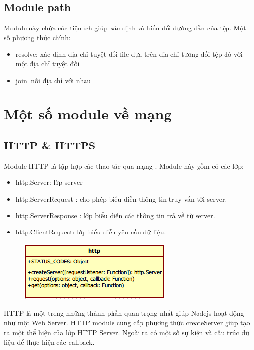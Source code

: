 	\subsection{Module  path}

		Module này chứa các tiện ích giúp xác định và biến đổi đường dẫn của tệp. Một số phương thức chính:
		\begin{itemize}
			\item resolve: xác định địa chỉ tuyệt đối file dựa trên địa chỉ tương đối tệp đó với một địa chỉ tuyệt đối
			\item join: nối địa chỉ với nhau
		\end{itemize}
		

\section{Một số module về mạng}
	\subsection{HTTP \& HTTPS}
	Module HTTP là tập hợp các thao tác qua mạng . Module này gồm có các lớp:
		\begin{itemize}
			\item http.Server: lớp server
			\item http.ServerRequest : cho phép biểu diễn thông tin truy vấn tới server.
			\item http.ServerResponse : lớp biểu diễn các thông tin trả về từ server.
			\item http.ClientRequest: lớp biểu diễn yêu cầu dữ liệu.
		\end{itemize}	
		
		\begin{figure}[h]
	    	\centering
			\includegraphics[scale=0.7]{3_3_1}
		\end{figure}		 
		
		HTTP là một trong những thành phần quan trọng nhất giúp Nodejs hoạt động như một Web Server. HTTP module cung cấp phương thức createServer giúp tạo ra một thể hiện của lớp HTTP Server. Ngoài ra có một số sự kiện và cấu trúc dữ liệu để thực hiện các callback.
		
